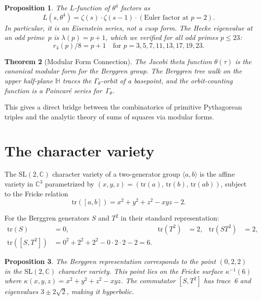 \documentclass[12pt]{amsart}
\newtheorem{theorem}{Theorem}[section]
\newtheorem{proposition}[theorem]{Proposition}
\theoremstyle{definition}
\theoremstyle{remark}
\newcommand{\SL}{\mathrm{SL}}
\newcommand{\C}{\mathbb{C}}
\newcommand{\HH}{\mathbb{H}}
\newcommand{\tr}{\mathrm{tr}}
\begin{document}
\begin{proposition}
The $L$-function of\/ $\theta^4$ factors as
\[
L(s, \theta^4) = \zeta(s) \cdot \zeta(s-1) \cdot (\text{Euler factor at }
p=2).
\]
In particular, it is an Eisenstein series, not a cusp form.  The Hecke
eigenvalue at an odd prime~$p$ is $\lambda(p) = p+1$, which we verified
for all odd primes $p \le 23$:
\[
r_4(p) / 8 = p + 1 \quad \text{for } p = 3, 5, 7, 11, 13, 17, 19, 23.
\]
\end{proposition}

\begin{theorem}[Modular Form Connection]\label{thm:modform}
The Jacobi theta function $\theta(\tau)$ is the canonical modular form
for the Berggren group.  The Berggren tree walk on the upper half-plane
$\HH$ traces the $\Gamma_\theta$-orbit of a basepoint, and the
orbit-counting function is a Poincar\'e series for~$\Gamma_\theta$.
\end{theorem}

This gives a direct bridge between the combinatorics of primitive
Pythagorean triples and the analytic theory of sums of squares via
modular forms.

\section{The character variety}\label{sec:character}

The $\SL(2,\C)$ character variety of a two-generator group
$\langle a, b \rangle$ is the affine variety in $\C^3$ parametrized
by $(x,y,z) = (\tr(a),\, \tr(b),\, \tr(ab))$, subject to the Fricke
relation
\begin{equation}\label{eq:fricke}
\tr([a,b]) = x^2 + y^2 + z^2 - xyz - 2.
\end{equation}

For the Berggren generators $S$ and $T^2$ in their standard
representation:
\begin{align*}
\tr(S) &= 0, & \tr(T^2) &= 2, & \tr(ST^2) &= 2, \\
\tr([S,T^2]) &= 0^2 + 2^2 + 2^2 - 0\cdot 2\cdot 2 - 2 = 6.
\end{align*}

\begin{proposition}\label{prop:character}
The Berggren representation corresponds to the point $(0, 2, 2)$ in
the $\SL(2,\C)$ character variety.  This point lies on the Fricke
surface $\kappa^{-1}(6)$ where $\kappa(x,y,z) = x^2+y^2+z^2-xyz$.
The commutator $[S, T^2]$ has trace~6 and eigenvalues
$3 \pm 2\sqrt{2}$, making it \emph{hyperbolic}.
\end{proposition}
\end{document}
